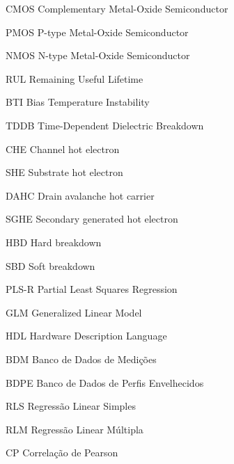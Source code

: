 \documentclass[
	12pt,				%
	twoside,			%
	a4paper,			%
	english,			%
	french,				%
	spanish,			%
	brazil				%
	]{abntex2}
\begin{document}
\imprimircapa






\setlength{\absparsep}{18pt} %




\listoffigures*
\cleardoublepage

\listoftables*
\cleardoublepage

\begin{siglas}
  \item[CMOS] Complementary Metal-Oxide Semiconductor
  \item[PMOS] P-type Metal-Oxide Semiconductor
  \item[NMOS] N-type Metal-Oxide Semiconductor
  \item[RUL] Remaining Useful Lifetime
  \item[BTI] Bias Temperature Instability
  \item[TDDB] Time-Dependent Dielectric Breakdown
  \item[CHE] Channel hot electron
  \item[SHE] Substrate hot electron
  \item[DAHC] Drain avalanche hot carrier
  \item[SGHE] Secondary generated hot electron
  \item[HBD] Hard breakdown
  \item[SBD] Soft breakdown
  \item[PLS-R] Partial Least Squares Regression
  \item[GLM] Generalized Linear Model
  \item[HDL] Hardware Description Language
  \item[BDM] Banco de Dados de Medições
  \item[BDPE] Banco de Dados de Perfis Envelhecidos
  \item[RLS] Regressão Linear Simples
  \item[RLM] Regressão Linear Múltipla
  \item[CP] Correlação de Pearson
\end{siglas}
\end{document}
